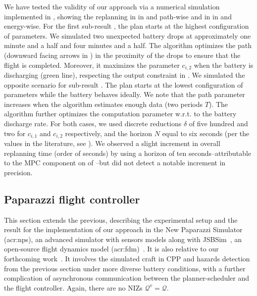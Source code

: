We have tested the validity of our approach via a numerical simulation implemented in \matlab{}, showing the replanning in  in  and  path-wise and in  in  and  energy-wise. For the first sub-result , the plan starts at the highest configuration of parameters. We simulated two unexpected battery drops at approximately one minute and a half and four minutes and a half. The algorithm optimizes the path (downward facing arrows in ) in the proximity of the drops to ensure that the flight is completed. Moreover, it maximizes the parameter $c_{i,2}$ when the battery is discharging (green line), respecting the output constraint in . We simulated the opposite scenario for sub-result . The plan starts at the lowest configuration of parameters while the battery behaves ideally. We note that the path parameter increases when the algorithm estimates enough data (two periods $T$). The algorithm further optimizes the computation parameter w.r.t. to the battery discharge rate. For both cases, we used discrete reductions $\delta$ of five hundred and two for $c_{i,1}$ and $c_{i,2}$ respectively, and the horizon $N$ equal to six seconds (per the values in the literature, see ). We observed a slight increment in overall replanning time (order of seconds) by using a horizon of ten seconds--attributable to the MPC component on  of --but did not detect a notable increment in precision. 


\subsection{Paparazzi flight controller}
\label{sec:res-papa}

This section extends the previous, describing the experimental setup and the result for the implementation of our approach in the New Paparazzi Simulator (\Gls{acr:nps}), an advanced simulator with sensors models along with JSBSim~\citep{berndt2004jsbsim}, an open-source flight dynamics model (\Gls{acr:fdm})~\citep{papanps}. It is also relative to our forthcoming work~\citep{seewald202Xenergy}. It involves the simulated craft in CPP and hazards detection from the previous section under more diverse battery conditions, with a further complication of asynchronous communication between the planner-scheduler and the flight controller. Again, there are no NIZs $\mathcal{Q}^v=\mathcal{Q}$.

